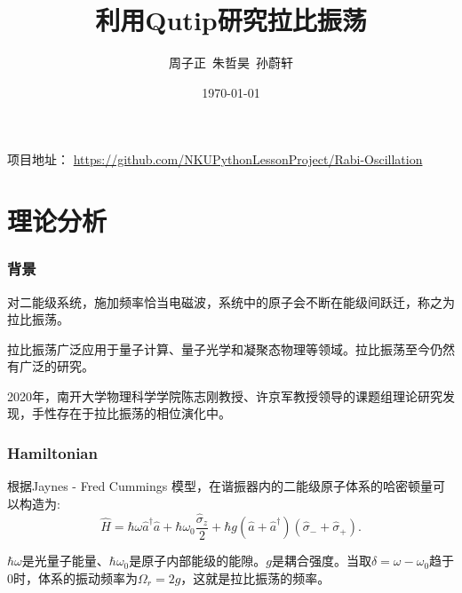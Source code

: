 \documentclass[aspectratio=169, 12pt]{beamer}
\title{利用Qutip研究拉比振荡}
\author[周子正.等]{周子正\ 朱哲昊\ 孙蔚轩}
\institute[南开大学]{南开大学\ 物理科学学院、金融学院}
\date{\today}
\begin{document}
\begin{frame}
    \titlepage
    \centering
    \small 项目地址：
    \url{https://github.com/NKUPythonLessonProject/Rabi-Oscillation}
\end{frame}
\AtBeginSection[]{\frame{\sectionpage}}
\begin{frame}
    \tableofcontents[hideallsubsections]
\end{frame}

\section{理论分析}

\begin{frame}
    \frametitle{背景}
    对二能级系统，施加频率恰当电磁波，系统中的原子会不断在能级间跃迁，称之为拉比振荡\cite{zhu_vacuum_1990}。

    \vspace{.7cm}

    拉比振荡广泛应用于量子计算、量子光学和凝聚态物理等领域。拉比振荡至今仍然有广泛的研究。

    \vspace{.7cm}

    2020年，南开大学物理科学学院陈志刚教授、许京军教授领导的课题组理论研究发现，手性存在于拉比振荡的相位演化中\cite{zhang_unveiling_2020}。
\end{frame}

\begin{frame}
    \frametitle{Hamiltonian}
    根据Jaynes - Fred Cummings 模型\cite{jaynes_comparison_1963}\cite{cummings_reminiscing_2013}，在谐振器内的二能级原子体系的哈密顿量可以构造为:
    \begin{equation}
        \hat{H}=\hbar \omega \hat{a}^{\dagger} \hat{a}+\hbar \omega_{0} \frac{\hat{\sigma}_{z}}{2}+\hbar g\left(\hat{a} +\hat{a}^{\dagger} \right)\left(\hat{\sigma}_{-}+\hat{\sigma}_{+}\right).
        \label{equ:H}
    \end{equation}

    $\hbar\omega$是光量子能量、$\hbar\omega_0$是原子内部能级的能隙。$g$是耦合强度。当取$\delta  = \omega-\omega_0$趋于0时，体系的振动频率为$\Omega_r = 2g$，这就是拉比振荡的频率。
\end{frame}
\end{document}
